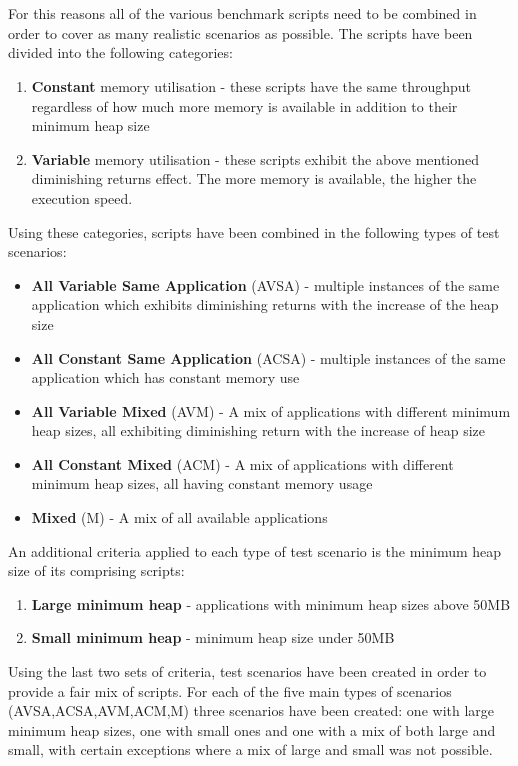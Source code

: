 \documentclass{l4proj}
\begin{document}
\\\\
For this reasons all of the various benchmark scripts need to be combined in order to cover as many realistic scenarios as possible. The scripts have been divided into the following categories:
\begin{enumerate}
\item \textbf{Constant} memory utilisation - these scripts have the same throughput regardless of how much more memory is available in addition to their minimum heap size
\item \textbf{Variable} memory utilisation - these scripts exhibit the above mentioned diminishing returns effect. The more memory is available, the higher the execution speed.
\end{enumerate}
Using these categories, scripts have been combined in the following types of test scenarios:
\begin{itemize}
\item \textbf{All Variable Same Application} (AVSA) - multiple instances of the same application which exhibits diminishing returns with the increase of the heap size
\item \textbf{All Constant Same Application} (ACSA) - multiple instances of the same application which has constant memory use
\item \textbf{All Variable Mixed} (AVM) - A mix of applications with different minimum heap sizes, all exhibiting diminishing return with the increase of heap size 
\item \textbf{All Constant Mixed} (ACM) - A mix of applications with different minimum heap sizes, all having constant memory usage
\item \textbf{Mixed} (M) - A mix of all available applications
\end{itemize}
An additional criteria applied to each type of test scenario is the minimum heap size of its comprising scripts:
\begin{enumerate}
\item \textbf{Large minimum heap} - applications with minimum heap sizes above 50MB
\item \textbf{Small minimum heap} - minimum heap size under 50MB
\end{enumerate}
Using the last two sets of criteria, test scenarios have been created in order to provide a fair mix of scripts. For each of the five main types of scenarios (AVSA,ACSA,AVM,ACM,M) three scenarios have been created: one with large minimum heap sizes, one with small ones and one with a mix of both large and small, with certain exceptions where a mix of large and small was not possible.
\end{document}

